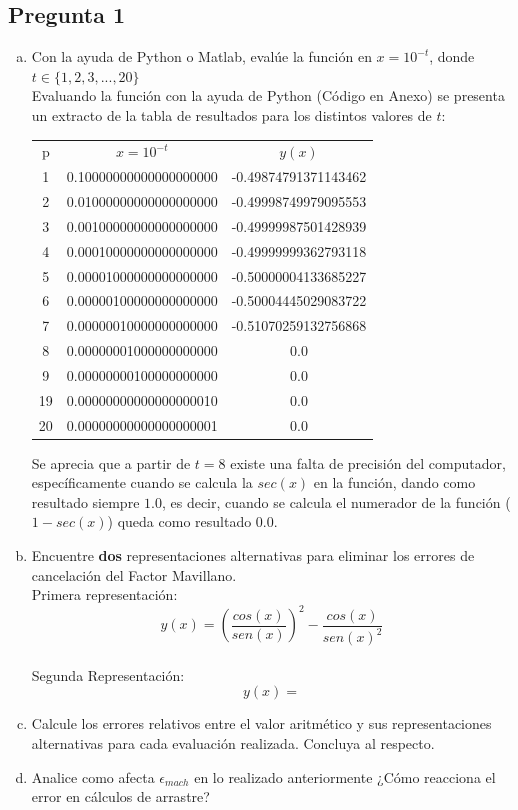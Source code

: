 \documentclass[10pt]{article}
\begin{document}
\subsection{Pregunta 1}
\begin{enumerate}[a)]
\item Con la ayuda de Python o Matlab, evalúe la función en $x=10^{-t}$, donde $t \in \{1, 2, 3,...,20\}$ \\
Evaluando la función con la ayuda de Python (Código en Anexo) se presenta un extracto de la tabla de resultados para los distintos valores de $t$:
\begin{center}
\begin{tabular}{|c|c|c|}
\cline{1-3}
p & $x=10^{-t}$ & $y(x)$  \\
\cline{1-3}
1 & 0.10000000000000000000 & -0.49874791371143462 \\
\cline{1-3}
2 & 0.01000000000000000000 & -0.49998749979095553 \\
\cline{1-3}
3 & 0.00100000000000000000 & -0.49999987501428939 \\
\cline{1-3}
4 & 0.00010000000000000000 & -0.49999999362793118 \\
\cline{1-3}
5 & 0.00001000000000000000 & -0.50000004133685227 \\
\cline{1-3}
6 & 0.00000100000000000000 & -0.50004445029083722 \\
\cline{1-3}
7 & 0.00000010000000000000 & -0.51070259132756868 \\
\cline{1-3}
8 & 0.00000001000000000000 & 0.0 \\
\cline{1-3}
9 & 0.00000000100000000000 & 0.0 \\
\cline{1-3}
19 & 0.00000000000000000010 & 0.0 \\
\cline{1-3}
20 & 0.00000000000000000001 & 0.0 \\
\cline{1-3}
\end{tabular}
\end{center}

Se aprecia que a partir de $t=8$ existe una falta de precisión del computador, específicamente cuando se calcula la $sec(x)$ en la función, dando como resultado siempre $1.0$, es decir, cuando se calcula el numerador de la función ($1-sec(x)$) queda como resultado $0.0$.

\item Encuentre \textbf{dos} representaciones alternativas para eliminar los errores de cancelación del Factor Mavillano. \\
Primera representación:
$$y(x)= \left(\frac{cos(x)}{sen(x)}\right)^2 - \frac{cos(x)}{sen(x)^2}$$ \\
Segunda Representación:
$$y(x)=$$

\item Calcule los errores relativos entre el valor aritmético y sus representaciones alternativas para cada evaluación realizada. Concluya al respecto.

\item Analice como afecta $\epsilon_{mach}$ en lo realizado anteriormente ¿Cómo reacciona el error en cálculos de arrastre?

\end{enumerate}
\end{document}
